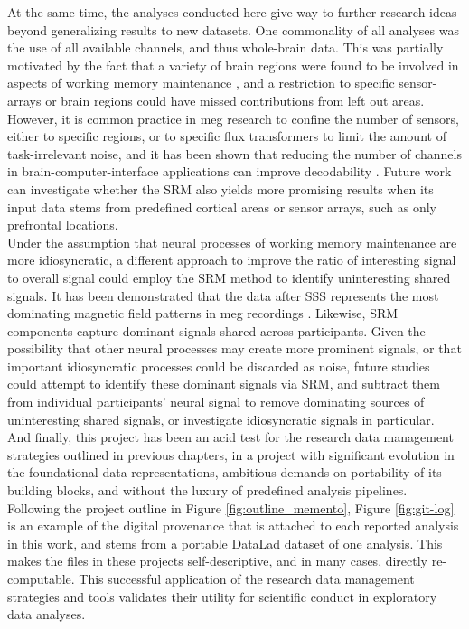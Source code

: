 At the same time, the analyses conducted here give way to further research ideas beyond generalizing results to new datasets.
One commonality of all analyses was the use of all available channels, and thus whole-brain data.
This was partially motivated by the fact that a variety of brain regions were found to be involved in aspects of working memory maintenance \citet{sreenivasan2019and}, and a restriction to specific sensor-arrays or brain regions could have missed contributions from left out areas.
However, it is common practice in \gls{meg} research to confine the number of sensors, either to specific regions, or to specific flux transformers \citep{garces2017choice} to limit the amount of task-irrelevant noise, and it has been shown that reducing the number of channels in brain-computer-interface applications can improve decodability \citep{roy2020assessing}.
Future work can investigate whether the \gls{SRM} also yields more promising results when its input data stems from predefined cortical areas or sensor arrays, such as only prefrontal locations.\\
Under the assumption that neural processes of working memory maintenance are more idiosyncratic, a different approach to improve the ratio of interesting signal to overall signal could employ the \gls{SRM} method to identify uninteresting shared signals.
It has been demonstrated that the data after \gls{SSS} represents the most dominating magnetic field patterns in \gls{meg} recordings \citep{garces2017choice}.
Likewise, \gls{SRM} components capture dominant signals shared across participants.
Given the possibility that other neural processes may create more prominent signals, or that important idiosyncratic processes could be discarded as noise, future studies could attempt to identify these dominant signals via \gls{SRM}, and subtract them from individual participants' neural signal to remove dominating sources of uninteresting shared signals, or investigate idiosyncratic signals in particular.\\
And finally, this project has been an acid test for the research data management strategies outlined in previous chapters, in a project with significant evolution in the foundational data representations, ambitious demands on portability of its building blocks, and without the luxury of predefined analysis pipelines.
Following the project outline in Figure \ref{fig:outline_memento}, Figure \ref{fig:git-log} is an example of the digital provenance that is attached to each reported analysis in this work, and stems from a portable DataLad dataset of one analysis.
This makes the files in these projects self-descriptive, and in many cases, directly re-computable.
This successful application of the research data management strategies and tools validates their utility for scientific conduct in exploratory data analyses.\\

